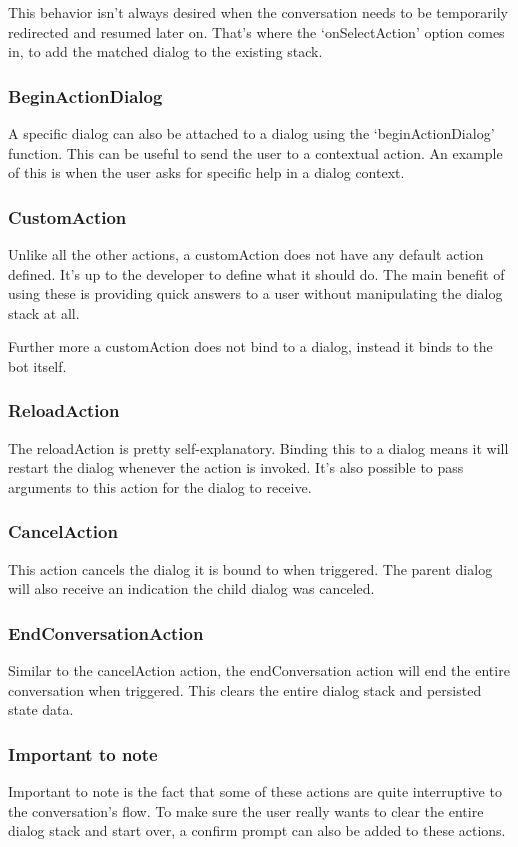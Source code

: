 This behavior isn't always desired when the conversation needs to be temporarily redirected and resumed later on. That's where the `onSelectAction' option comes in, to add the matched dialog to the existing stack.

\subsubsection{BeginActionDialog}

A specific dialog can also be attached to a dialog using the `beginActionDialog' function. This can be useful to send the user to a contextual action. An example of this is when the user asks for specific help in a dialog context.

\subsubsection{CustomAction}

Unlike all the other actions, a customAction does not have any default action defined. It's up to the developer to define what it should do. The main benefit of using these is providing quick answers to a user without manipulating the dialog stack at all.

Further more a customAction does not bind to a dialog, instead it binds to the bot itself.

\subsubsection{ReloadAction}

The reloadAction is pretty self-explanatory. Binding this to a dialog means it will restart the dialog whenever the action is invoked. It's also possible to pass arguments to this action for the dialog to receive.

\subsubsection{CancelAction}

This action cancels the dialog it is bound to when triggered. The parent dialog will also receive an indication the child dialog was canceled.

\subsubsection{EndConversationAction}

Similar to the cancelAction action, the endConversation action will end the entire conversation when triggered. This clears the entire dialog stack and persisted state data.

\subsubsection{Important to note}

Important to note is the fact that some of these actions are quite interruptive to the conversation's flow. To make sure the user really wants to clear the entire dialog stack and start over, a confirm prompt can also be added to these actions.